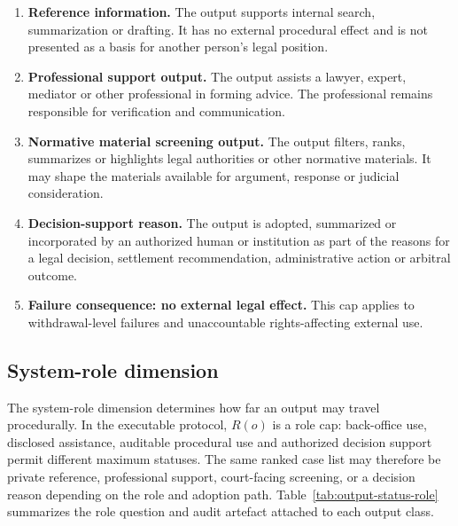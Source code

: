 \documentclass[12pt,a4paper]{article}
\begin{document}
\begin{enumerate}
\item \textbf{Reference information.} The output supports internal search, summarization or drafting. It has no external procedural effect and is not presented as a basis for another person's legal position.
\item \textbf{Professional support output.} The output assists a lawyer, expert, mediator or other professional in forming advice. The professional remains responsible for verification and communication.
\item \textbf{Normative material screening output.} The output filters, ranks, summarizes or highlights legal authorities or other normative materials. It may shape the materials available for argument, response or judicial consideration.
\item \textbf{Decision-support reason.} The output is adopted, summarized or incorporated by an authorized human or institution as part of the reasons for a legal decision, settlement recommendation, administrative action or arbitral outcome.
\item \textbf{Failure consequence: no external legal effect.} This cap applies to withdrawal-level failures and unaccountable rights-affecting external use.
\end{enumerate}

\subsection{System-role dimension}

The system-role dimension determines how far an output may travel procedurally. In the executable protocol, $R(o)$ is a role cap: back-office use, disclosed assistance, auditable procedural use and authorized decision support permit different maximum statuses. The same ranked case list may therefore be private reference, professional support, court-facing screening, or a decision reason depending on the role and adoption path. Table~\ref{tab:output-status-role} summarizes the role question and audit artefact attached to each output class.
\end{document}
